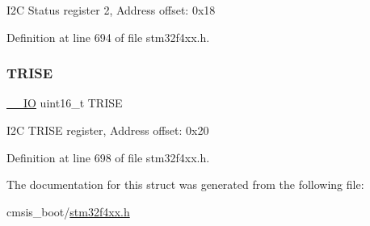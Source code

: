 I2C Status register 2, Address offset\+: 0x18 

Definition at line 694 of file stm32f4xx.\+h.

\mbox{\label{struct_i2_c___type_def_a7fbb70132ee565bb179078b6ee20cc2b}} 
\subsubsection{\texorpdfstring{T\+R\+I\+SE}{TRISE}}
{\footnotesize\ttfamily \hyperlink{group___c_m_s_i_s__core__definitions_gaec43007d9998a0a0e01faede4133d6be}{\+\_\+\+\_\+\+IO} uint16\+\_\+t T\+R\+I\+SE}

I2C T\+R\+I\+SE register, Address offset\+: 0x20 

Definition at line 698 of file stm32f4xx.\+h.



The documentation for this struct was generated from the following file\+:\begin{DoxyCompactItemize}
\item 
cmsis\+\_\+boot/\hyperlink{stm32f4xx_8h}{stm32f4xx.\+h}\end{DoxyCompactItemize}
